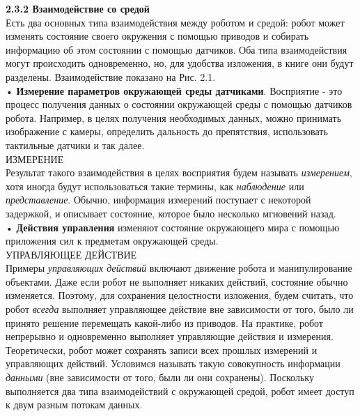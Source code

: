 \documentclass[10pt,a4paper]{article}
\begin{document}
 \textbf{2.3.2 Взаимодействие со средой}\\
 
 Есть два основных типа взаимодействия между роботом и средой: робот может изменять состояние своего окружения с помощью приводов и собирать информацию об этом состоянии с помощью датчиков. 
 Оба типа взаимодействия могут происходить одновременно, но, для удобства изложения, в книге они будут разделены. Взаимодействие показано на Рис. 2.1.\\
 
 • \textbf{Измерение параметров окружающей среды датчиками}. Восприятие - это процесс получения данных о состоянии окружающей среды с помощью датчиков робота. Например, в целях получения необходимых данных, можно принимать изображение с камеры, определить дальность до препятствия, использовать тактильные датчики и так далее.\\
 ИЗМЕРЕНИЕ\\
 Результат такого взаимодействия в целях восприятия будем называть \textit{измерением}, хотя иногда будут использоваться такие термины, как \textit{наблюдение} или \textit{представление}. Обычно, информация измерений поступает с некоторой задержкой, и описывает состояние, которое было несколько мгновений назад.\\
 
 • \textbf{Действия управления} изменяют состояние окружающего мира с помощью приложения сил к предметам окружающей среды.\\УПРАВЛЯЮЩЕЕ ДЕЙСТВИЕ\\ Примеры \textit{управляющих действий} включают движение робота и манипулирование объектами. Даже если робот не выполняет никаких действий, состояние обычно изменяется. Поэтому, для сохранения целостности изложения, будем считать, что робот \textit{всегда} выполняет управляющее действие вне зависимости от того, было ли принято решение перемещать какой-либо из приводов.
 На практике, робот непрерывно и одновременно выполняет управляющие действия и измерения.\\
  
 Теоретически, робот может сохранять записи всех прошлых измерений и управляющих действий. Условимся называть такую совокупность информации \textit{данными} (вне зависимости от того, были ли они сохранены). Поскольку выполняется два типа взаимодействий с окружающей средой, робот имеет доступ к двум разным потокам данных.\\
 
\end{document}
